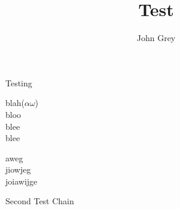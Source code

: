 \documentclass[12pt]{article}
\title{Test}
\author{John Grey}
\begin{document}
\begin{eventchain}{Testing}
  \eventStart
  \eventContinue
  \begin{changes}[left]
    blah($ \alpha \omega $) \\
    bloo\\
    blee\\
    blee\\
  \end{changes}
  \begin{fluents}[right]
     
  \end{fluents}
  \begin{changes}[left]
    aweg\\
    jiowjeg\\
    joiawijge\\
  \end{changes}
  \eventFinish
\end{eventchain}

\begin{eventchain}{Second Test Chain}
  \eventContinue
  \eventStart[5]
  \eventContinue
\end{eventchain}


% 
% 
\end{document}
